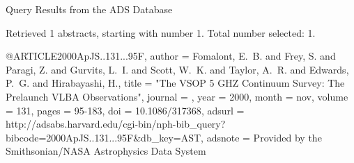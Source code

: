 Query Results from the ADS Database


Retrieved 1 abstracts, starting with number 1.  Total number selected: 1.

@ARTICLE{2000ApJS..131...95F,
   author = {{Fomalont}, E.~B. and {Frey}, S. and {Paragi}, Z. and {Gurvits}, L.~I. and 
	{Scott}, W.~K. and {Taylor}, A.~R. and {Edwards}, P.~G. and 
	{Hirabayashi}, H.},
    title = "{The VSOP 5 GHZ Continuum Survey: The Prelaunch VLBA Observations}",
  journal = {\apjs},
     year = 2000,
    month = nov,
   volume = 131,
    pages = {95-183},
      doi = {10.1086/317368},
   adsurl = {http://adsabs.harvard.edu/cgi-bin/nph-bib_query?bibcode=2000ApJS..131...95F&db_key=AST},
  adsnote = {Provided by the Smithsonian/NASA Astrophysics Data System}
}



